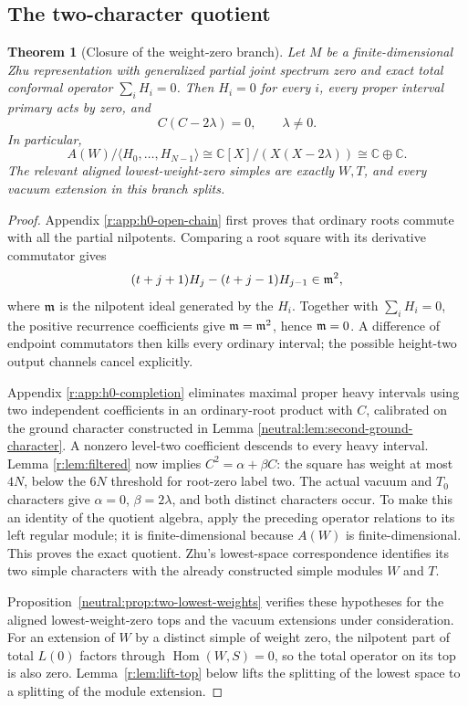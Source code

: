 \documentclass[11pt,a4paper]{article}
\numberwithin{equation}{section}
\newtheorem{theorem}{Theorem}[section]
\theoremstyle{definition}\newtheorem{definition}[theorem]{Definition}
\theoremstyle{remark}\newtheorem{remark}[theorem]{Remark}
\newcommand{\C}{\mathbb C}\newcommand{\Z}{\mathbb Z}\newcommand{\Q}{\mathbb Q}
\newcommand{\Hom}{\operatorname{Hom}}\newcommand{\End}{\operatorname{End}}
\begin{document}
\subsection{The two-character quotient}

\begin{theorem}[Closure of the weight-zero branch]\label{r:thm:h0}
Let \(M\) be a finite-dimensional Zhu representation with
generalized partial joint spectrum zero and exact total
conformal operator \(\sum_iH_i=0\). Then \(H_i=0\) for every
\(i\), every proper interval primary acts by zero, and
\[
             C(C-2\lambda)=0,\qquad \lambda\ne0.
\]
In particular,
\[
 A(W)/\langle H_0,\ldots,H_{N-1}\rangle
 \cong\C[X]/(X(X-2\lambda))\cong\C\oplus\C.
\]
The relevant aligned lowest-weight-zero simples are exactly
\(W,T\), and every vacuum extension in this branch splits.
\end{theorem}

\begin{proof}
Appendix \ref{r:app:h0-open-chain} first proves that ordinary
roots commute with all the partial nilpotents. Comparing a
root square with its derivative commutator gives
\[
 (t+j+1)H_j-(t+j-1)H_{j-1}\in\mathfrak m^2,
\]
where \(\mathfrak m\) is the nilpotent ideal generated by the \(H_i\).
Together with \(\sum_iH_i=0\), the positive recurrence coefficients
give \(\mathfrak m=\mathfrak m^2\), hence \(\mathfrak m=0\).
A difference of endpoint commutators then kills every ordinary
interval; the possible height-two output channels cancel explicitly.

Appendix \ref{r:app:h0-completion} eliminates maximal proper heavy
intervals using two independent coefficients in an ordinary-root
product with \(C\), calibrated on the ground character constructed in
Lemma \ref{neutral:lem:second-ground-character}.
A nonzero level-two coefficient descends to every heavy interval.
Lemma \ref{r:lem:filtered} now implies \(C^2=\alpha+\beta C\):
the square has weight at most \(4N\), below the \(6N\) threshold
for root-zero label two. The actual vacuum and \(T_0\) characters
give \(\alpha=0\), \(\beta=2\lambda\), and both distinct
characters occur. To make this an identity of the quotient algebra,
apply the preceding operator relations to its left regular module;
it is finite-dimensional because \(A(W)\) is finite-dimensional.
This proves the exact quotient. Zhu's lowest-space correspondence
\cite[Theorem 2.2.2]{zhu} identifies its two simple characters with
the already constructed simple modules \(W\) and \(T\).

Proposition~\ref{neutral:prop:two-lowest-weights} verifies these
hypotheses for the aligned lowest-weight-zero tops and the vacuum
extensions under consideration.
For an extension of \(W\) by a distinct simple of weight zero,
the nilpotent part of total \(L(0)\) factors through
\(\Hom(W,S)=0\), so the total operator on its top is also zero.
Lemma~\ref{r:lem:lift-top} below lifts the splitting of the lowest
space to a splitting of the module extension.
\end{proof}
\end{document}
